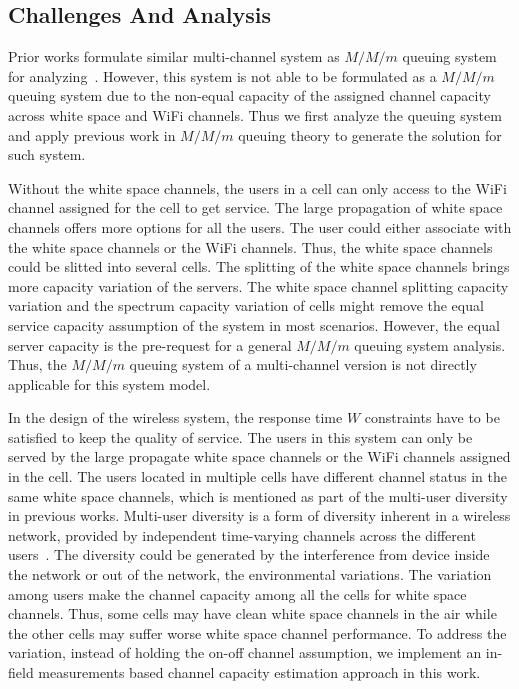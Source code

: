 \subsection{Challenges And Analysis}
\label{subsec:challenge}
Prior works formulate similar multi-channel system as $M/M/m$ queuing system for analyzing~\cite{bodas2012low}.
However, this system is not able to be formulated as a $M/M/m$ queuing system due to the 
non-equal capacity of the assigned channel capacity across white space and WiFi channels.
Thus we first analyze the queuing system and apply previous work in $M/M/m$ queuing theory to 
generate the solution for such system.

Without the white space channels, the users in a cell can only access to the WiFi channel assigned for the 
cell to get service. The large propagation of white space channels offers more options for all the users. 
The user could either associate with the white space channels or the WiFi channels. 
Thus, the white space channels could be slitted into several cells. 
The splitting of the white space channels brings more capacity variation of the servers. 
The white space channel splitting capacity variation and the spectrum capacity variation of cells might remove the 
equal service capacity assumption of the system in most scenarios.
However, the equal server capacity is the pre-request for a general $M/M/m$ queuing system analysis.
Thus, the $M/M/m$ queuing system of a multi-channel version is not directly applicable for this system model.



In the design of the wireless system, the response time $W$ constraints have to be satisfied to keep the 
quality of service. 
The users in this system can only be served by the large propagate white space channels or the WiFi 
channels assigned in the cell. 
The users located in multiple cells have different channel status in the same white space channels, 
which is mentioned as part of the multi-user diversity in previous works. Multi-user diversity is a 
form of diversity inherent in a wireless network, provided by independent time-varying channels across 
the different users~\cite{viswanath2002opportunistic}. 
The diversity could be generated by the interference from device inside the network or out of the network, 
the environmental variations.  
The variation among users make the channel capacity among all the cells for white space channels. 
Thus, some cells may have clean white space channels in the air while the other cells may suffer 
worse white space channel performance. 
To address the variation, instead of holding the on-off channel assumption, we implement an in-field 
measurements based channel capacity estimation approach in this work.

